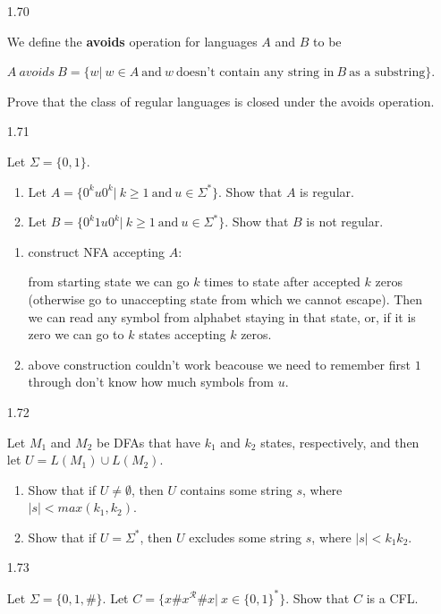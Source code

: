 \begin{enumerate}

      \item [1.70]

            We define the \textbf{avoids} operation for languages $A$ and $B$ to be

            $A ~avoids~ B = \{w|~w \in A ~\text{and} ~w~ \text{doesn’t contain any string in}~ B~ \text{as a substring}\}$.

            Prove that the class of regular languages is closed under the avoids operation.

      \item [1.71]

            Let $\Sigma =\{0,1\}$.

            \begin{enumerate}
                  \item Let $A =\{0^k u 0^k|~k \ge 1 ~\text{and}~ u \in \Sigma^\ast\}$. Show that $A$ is regular.
                  \item Let $B =\{0^k 1u0^k|~k \ge 1 ~\text{and}~ u \in \Sigma^\ast\}$. Show that $B$ is not regular.
            \end{enumerate}

            \begin{enumerate}
                  \item construct NFA accepting $A$:

                        from starting state we can go $k$ times to state after accepted $k$ zeros (otherwise go to unaccepting state from which we cannot escape). Then we can read any symbol from alphabet staying in that state, or, if it is zero we can go to $k$ states accepting $k$ zeros.

                  \item above construction couldn't work beacouse we need to remember first $1$ through don't know how much symbols from $u$.
            \end{enumerate}

      \item [1.72]

            Let $M_1$ and $M_2$ be DFAs that have $k_1$ and $k_2$ states, respectively, and then let
            $U = L(M_1) \cup L(M_2)$.
            \begin{enumerate}
                  \item Show that if $U \neq \emptyset$, then $U$ contains some string $s$, where $|s| < max(k_1,k_2)$.
                  \item Show that if $U=\Sigma^\ast$, then $U$ excludes some string $s$, where $|s| < k_1 k_2$.
            \end{enumerate}

      \item [1.73]

            Let $\Sigma =\{0,1,\#\}$. Let $C = \{x\#x^\mathcal{R}\#x|~x \in \{0,1\}^\ast\}$. Show that $C$ is a CFL.



\end{enumerate}
